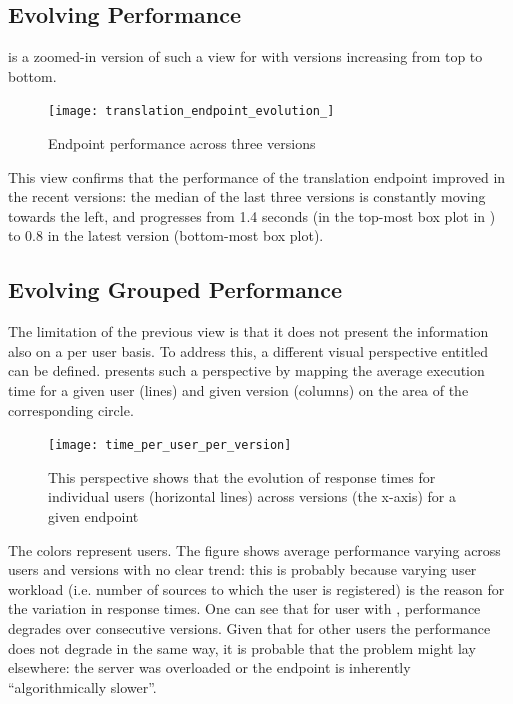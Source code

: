   \subsection*{Evolving Performance}

     is a zoomed-in version of such a view for \epTranslationsColor with versions increasing from top to bottom.

    \begin{figure}[h!]
      \centering
      \texttt{[image: translation\_endpoint\_evolution\_]}
      \caption{Endpoint performance across three versions}
      \label{fig:tee}
    \end{figure}


  This view confirms that the performance of the translation endpoint improved in the recent versions: the median of the last three versions is constantly moving towards the left, and progresses from 1.4 seconds (in the top-most box plot in ) to 0.8 in the latest version (bottom-most box plot).


\subsection*{Evolving Grouped Performance}
  The limitation of the previous view is that it does not present the information also on a per user basis. To address this, a different visual perspective entitled  can be defined.  presents such a perspective by mapping the average execution time for a given user (lines) and given version (columns) on the area of the corresponding circle. 

\begin{figure}[h!]
  \centering
  \texttt{[image: time\_per\_user\_per\_version]}
  \caption{This perspective shows that the evolution of response times for individual users (horizontal lines) across versions (the x-axis) for a given endpoint}
  \label{fig:tuv}
\end{figure}


The colors represent users. The figure shows average performance varying  across users and versions with no clear trend: this is probably because varying user workload (i.e. number of sources to which the user is registered) is the reason for the variation in response times. One can see that for user with , performance degrades over consecutive versions. Given that for other users the performance does not degrade in the same way, it is probable that the problem might lay elsewhere: the server was overloaded or the endpoint is inherently ``algorithmically slower''. 


  
